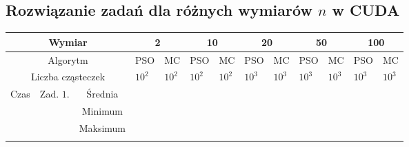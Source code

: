 \documentclass[11pt, a4paper, oneside]{article}
\begin{document}
\subsection{Rozwiązanie zadań dla różnych wymiarów $n$ w CUDA} \label{sec:table:cuda}
\renewcommand{\arraystretch}{2}
\begin{table}[t]
\scriptsize
\begin{adjustwidth}{-1.76cm}{}
\centering
\begin{tabular}{|c|c|c|l|l|l|l|l|l|l|l|l|l|}
\hline
\multicolumn{3}{|c|}{Wymiar}                                   & \multicolumn{2}{c|}{2}                             & \multicolumn{2}{c|}{10}                            & \multicolumn{2}{c|}{20}                            & \multicolumn{2}{c|}{50}                            & \multicolumn{2}{c|}{100}                           \\ \hline
\multicolumn{3}{|c|}{Algorytm}                                 & \multicolumn{1}{c|}{PSO} & \multicolumn{1}{c|}{MC} & \multicolumn{1}{c|}{PSO} & \multicolumn{1}{c|}{MC} & \multicolumn{1}{c|}{PSO} & \multicolumn{1}{c|}{MC} & \multicolumn{1}{c|}{PSO} & \multicolumn{1}{c|}{MC} & \multicolumn{1}{c|}{PSO} & \multicolumn{1}{c|}{MC} \\ \hline
\multicolumn{3}{|c|}{Liczba cząsteczek}                        & $10^{2}$                 & $10^{2}$                & $10^{2}$                 & $10^{2}$                & $10^{3}$                 & $10^{3}$                & $10^{3}$                 & $10^{3}$                & $10^{3}$                 & $10^{3}$                \\ \hline
\multirow{8}{*}{Czas} & \multirow{4}{*}{Zad. $1$.} & Średnia   &                          &                         &                          &                         &                          &                         &                          &                         &                          &                         \\ \cline{3-13} 
                      &                            & Minimum   &                          &                         &                          &                         &                          &                         &                          &                         &                          &                         \\ \cline{3-13} 
                      &                            & Maksimum  &                          &                         &                          &                         &                          &                         &                          &                         &                          &                         \\ \cline{3-13} 

\end{tabular}
\end{adjustwidth}
\end{table}
\end{document}
